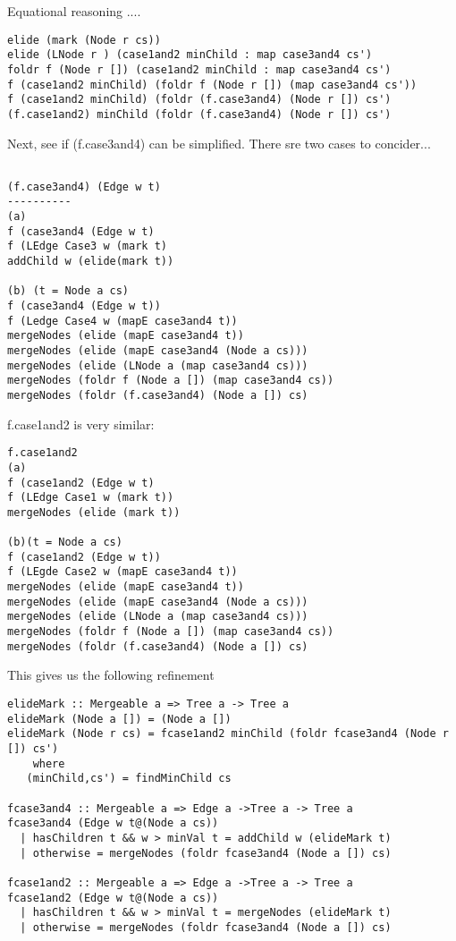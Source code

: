 \documentclass{jfp}
\begin{document}
Equational reasoning ....

\begin{verbatim}
elide (mark (Node r cs))
elide (LNode r ) (case1and2 minChild : map case3and4 cs')
foldr f (Node r []) (case1and2 minChild : map case3and4 cs')
f (case1and2 minChild) (foldr f (Node r []) (map case3and4 cs'))
f (case1and2 minChild) (foldr (f.case3and4) (Node r []) cs')
(f.case1and2) minChild (foldr (f.case3and4) (Node r []) cs')
\end{verbatim}

Next, see if (f.case3and4) can be simplified.
There sre two cases to concider...
\begin{verbatim}

(f.case3and4) (Edge w t)
----------
(a)
f (case3and4 (Edge w t)
f (LEdge Case3 w (mark t)
addChild w (elide(mark t))

(b) (t = Node a cs)
f (case3and4 (Edge w t))
f (Ledge Case4 w (mapE case3and4 t))
mergeNodes (elide (mapE case3and4 t))
mergeNodes (elide (mapE case3and4 (Node a cs)))
mergeNodes (elide (LNode a (map case3and4 cs)))
mergeNodes (foldr f (Node a []) (map case3and4 cs))
mergeNodes (foldr (f.case3and4) (Node a []) cs)

\end{verbatim}

f.case1and2 is very similar:

\begin{verbatim}
f.case1and2
(a)
f (case1and2 (Edge w t)
f (LEdge Case1 w (mark t))
mergeNodes (elide (mark t))

(b)(t = Node a cs)
f (case1and2 (Edge w t))
f (LEgde Case2 w (mapE case3and4 t))
mergeNodes (elide (mapE case3and4 t))
mergeNodes (elide (mapE case3and4 (Node a cs)))
mergeNodes (elide (LNode a (map case3and4 cs)))
mergeNodes (foldr f (Node a []) (map case3and4 cs))
mergeNodes (foldr (f.case3and4) (Node a []) cs)

\end{verbatim}
This gives us the following refinement

\begin{verbatim}
elideMark :: Mergeable a => Tree a -> Tree a
elideMark (Node a []) = (Node a [])
elideMark (Node r cs) = fcase1and2 minChild (foldr fcase3and4 (Node r []) cs')
    where
   (minChild,cs') = findMinChild cs

fcase3and4 :: Mergeable a => Edge a ->Tree a -> Tree a
fcase3and4 (Edge w t@(Node a cs))
  | hasChildren t && w > minVal t = addChild w (elideMark t)
  | otherwise = mergeNodes (foldr fcase3and4 (Node a []) cs)

fcase1and2 :: Mergeable a => Edge a ->Tree a -> Tree a
fcase1and2 (Edge w t@(Node a cs))
  | hasChildren t && w > minVal t = mergeNodes (elideMark t)
  | otherwise = mergeNodes (foldr fcase3and4 (Node a []) cs)

\end{verbatim}
\begin{verbatim}
\end{verbatim}
\begin{verbatim}
\end{verbatim}
\end{document}
